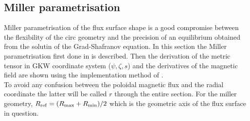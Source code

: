 
\subsection{Miller parametrisation}
Miller parametrisation of the flux surface shape is a good compromise between the flexibility of the circ geometry and the precision of an equilibrium obtained from the solutin of the Grad-Shafranov equation.
In this section the Miller parametrisation first done in \cite{MIL98} is described. Then the derivation of the metric tensor in GKW coordinate system ($\psi,\zeta,s$) and the derivatives of the magnetic field are shown using the implementation method of \cite{CAN09}. \\
To avoid any confusion between the poloidal magnetic flux and the radial coordinate the latter will be called $r$ through the entire section.  For the miller geometry, $R_{\rm ref} = (R_{\rm max} + R_{\rm min})/2 $ which is the geometric axis of the flux surface in question.

